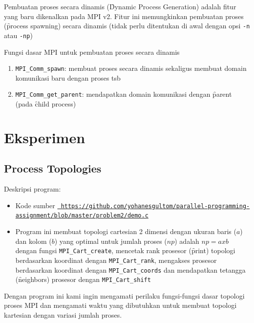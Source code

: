 Pembuatan proses secara dinamis (\f{Dynamic Process Generation}) adalah fitur yang baru dikenalkan pada MPI v2. Fitur ini memungkinkan pembuatan proses (\f{process spawning}) secara dinamis (tidak perlu ditentukan di awal dengan opsi \verb|-n| atau \verb|-np|)

Fungsi dasar MPI untuk pembuatan proses secara dinamis

\begin{enumerate}
	\item \verb|MPI_Comm_spawn|: membuat proses secara dinamis sekaligus membuat domain komunikasi baru dengan proses tsb
	\item \verb|MPI_Comm_get_parent|: mendapatkan domain komunikasi dengan \f{parent} (pada \f{child process})
\end{enumerate}

\section{Eksperimen}

\subsection{Process Topologies}

Deskripsi program:

\begin{itemize}
	\item Kode sumber \texttt{\url{ https://github.com/yohanesgultom/parallel-programming-assignment/blob/master/problem2/demo.c}}
	\item Program ini membuat topologi cartesian 2 dimensi dengan ukuran baris ($a$) dan kolom ($b$) yang optimal untuk jumlah proses ($np$) adalah $np = a x b$ dengan fungsi \verb|MPI_Cart_create|, mencetak rank prosesor (\f{print}) topologi berdasarkan koordinat dengan \verb|MPI_Cart_rank|, mengakses prosesor berdasarkan koordinat dengan \verb|MPI_Cart_coords| dan mendapatkan tetangga (\f{neighbors}) prosesor dengan \verb|MPI_Cart_shift| 
\end{itemize}

Dengan program ini kami ingin mengamati perilaku fungsi-fungsi dasar topologi proses MPI dan mengamati waktu yang dibutuhkan untuk membuat topologi kartesian dengan variasi jumlah proses.

